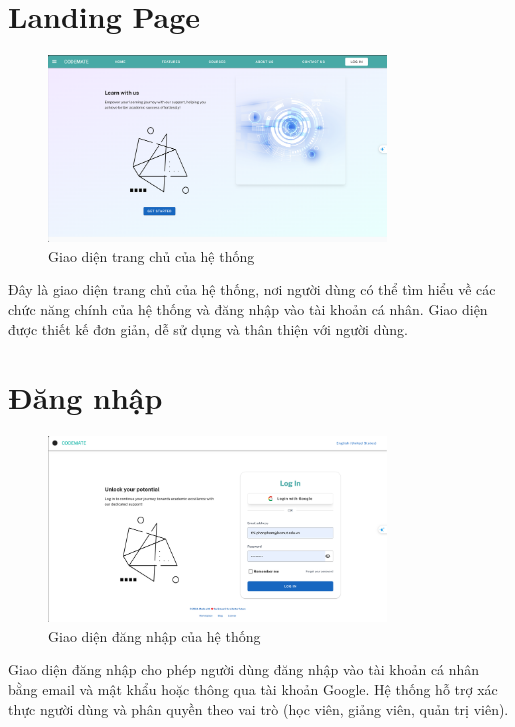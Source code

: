 \section{Landing Page}
\begin{figure}[H]
    \centering
    \includegraphics[width=0.8\textwidth]{images/CapScreen_Student/LandingPage.png}
    \caption{Giao diện trang chủ của hệ thống}
    \label{fig:landing_page}
\end{figure}
Đây là giao diện trang chủ của hệ thống, nơi người dùng có thể tìm hiểu về các chức năng chính của hệ thống và đăng nhập vào tài khoản cá nhân. Giao diện được thiết kế đơn giản, dễ sử dụng và thân thiện với người dùng.
\section{Đăng nhập}
\begin{figure}[H]
    \centering
    \includegraphics[width=0.8\textwidth]{images/CapScreen_Student/Login.png}
    \caption{Giao diện đăng nhập của hệ thống}
    \label{fig:login_page}
\end{figure}
Giao diện đăng nhập cho phép người dùng đăng nhập vào tài khoản cá nhân bằng email và mật khẩu hoặc thông qua tài khoản Google. Hệ thống hỗ trợ xác thực người dùng và phân quyền theo vai trò (học viên, giảng viên, quản trị viên).

